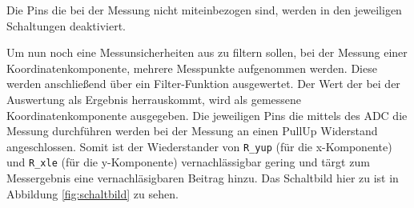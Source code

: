 Die Pins die bei der Messung nicht miteinbezogen sind, werden in den jeweiligen Schaltungen deaktiviert.

Um nun noch eine Messunsicherheiten aus zu filtern sollen, bei der Messung einer Koordinatenkomponente, mehrere Messpunkte aufgenommen werden.
Diese werden anschließend über ein Filter-Funktion ausgewertet.
Der Wert der bei der Auswertung als Ergebnis herrauskommt, wird als gemessene Koordinatenkomponente ausgegeben.
Die jeweiligen Pins die mittels des ADC die Messung durchführen werden bei der Messung an einen PullUp Widerstand angeschlossen.
Somit ist der Wiederstander von \verb$R_yup$ (für die x-Komponente) und \verb$R_xle$ (für die y-Komponente) vernachlässigbar gering und tärgt zum Messergebnis eine vernachläsigbaren Beitrag hinzu.
Das Schaltbild hier zu ist in Abbildung \cref{fig:schaltbild} zu sehen.


